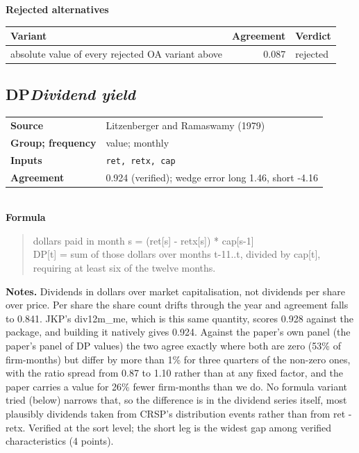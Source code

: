 \documentclass[11pt]{article}
\begin{document}
\textbf{Rejected alternatives}\\[2pt]
{\small\begin{longtable}{@{}p{9.6cm}rp{4.3cm}@{}}
\toprule Variant & Agreement & Verdict\\\midrule\endhead
absolute value of every rejected OA variant above & 0.087 & rejected\\
\bottomrule\end{longtable}}
\subsection*{DP\quad\normalfont\itshape Dividend yield}
\begin{tabular}{@{}p{3.3cm}p{12.3cm}@{}}
\textbf{Source} & Litzenberger and Ramaswamy (1979)\\
\textbf{Group; frequency} & value; monthly\\
\textbf{Inputs} & \texttt{ret, retx, cap}\\
\textbf{Agreement} & 0.924 (verified); wedge error long 1.46, short -4.16\\
\end{tabular}\\[4pt]
\textbf{Formula}
\begin{quote}\small
dollars paid in month s = (ret[s] - retx[s]) * cap[s-1]\\
DP[t] = sum of those dollars over months t-11..t, divided by cap[t],\\
requiring at least six of the twelve months.\\

\end{quote}
\textbf{Notes.} Dividends in dollars over market capitalisation, not dividends per share over price. Per share the share count drifts through the year and agreement falls to 0.841. JKP's div12m\_me, which is this same quantity, scores 0.928 against the package, and building it natively gives 0.924. Against the paper's own panel (the paper's panel of DP values) the two agree exactly where both are zero (53\% of firm-months) but differ by more than 1\% for three quarters of the non-zero ones, with the ratio spread from 0.87 to 1.10 rather than at any fixed factor, and the paper carries a value for 26\% fewer firm-months than we do. No formula variant tried (below) narrows that, so the difference is in the dividend series itself, most plausibly dividends taken from CRSP's distribution events rather than from ret - retx. Verified at the sort level; the short leg is the widest gap among verified characteristics (4 points).
\end{document}
